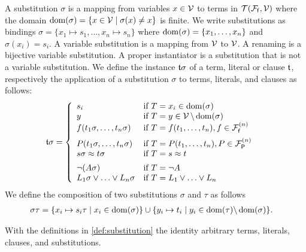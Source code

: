 
\begin{definition}\label{def:substitution}
	A {\myem substitution} $\sigma$ is a mapping from variables $x\in{\mathcal V}$ to terms in ${{\mathcal T}({\mathcal F}_{\mathsf f},{\mathcal V})}$
	where the {\myem domain }$\operatorname{dom}(\sigma) = \{ x\in{\mathcal V}\mid\sigma(x) \neq x \}$ is finite.
	We write substitutions as bindings $\sigma=\{ x_1\mapsto s_1,\ldots,x_n\mapsto s_n \}$
	where $\operatorname{dom}(\sigma)=\{ x_1,\ldots,x_n \}$ and $\sigma(x_i)=s_i$.
	A {\myem variable substitution} is a mapping from ${\mathcal V}$ to ${\mathcal V}$.
	A {\myem renaming} is a bijective variable substitution.
	A {\myem proper instantiator} is a substitution that is not a variable substitution.
	We define the instance ${\mathfrak t}\sigma$ of a term, literal or clause ${\mathfrak t}$,
	respectively the application of a substitution $\sigma$ to terms, literals, and clauses as follows:
	\begin{align*}
		{\mathfrak t}\sigma &= \left\{\begin{array}{ll}
			s_i 					& \text{if }T=x_i\in\operatorname{dom}(\sigma)\\
			y					& \text{if }T=y\in{\mathcal V}\,\backslash\operatorname{dom}(\sigma)\\
			f(t_1\sigma,\ldots,t_n\sigma)	&\text{if }T=f(t_1,\ldots,t_n), f\in{{\mathcal F}_{\mathsf f}^{(n)}} \\[0.5em]
			P(t_1\sigma,\ldots,t_n\sigma)	&\text{if }T=P(t_1,\ldots,t_n), P\in{{\mathcal F}_{\mathsf P}^{(n)}} \\
			s\sigma\approx t\sigma			&\text{if }T=s\approx t \\[0.5em]
			\lnot(A\sigma)					&\text{if }T=\lnot A \\
			L_1\sigma\lor\ldots\lor L_n\sigma	&\text{if }T=L_1\lor\ldots\lor L_n \\
		\end{array}\right.	
	\end{align*}
%	
	We define the {\myem composition} of two substitutions $\sigma$ and $\tau$ as follows
	\begin{align*}
		\sigma\tau&=\{ x_i\mapsto s_i\tau\mid x_i\in\operatorname{dom}(\sigma) \}
		\cup
		\{ y_i\mapsto t_i\mid y_i\in\operatorname{dom}(\tau) \backslash \operatorname{dom}(\sigma) \}.
	\end{align*}
	
\end{definition}

\begin{lemma}\label{lem:substitution}
	With the definitions in \ref{def:substitution} the identity
	arbitrary terms, literals, clauses, and substitutions.
\end{lemma}